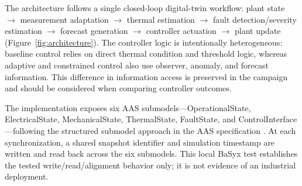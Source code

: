 \documentclass[machines,article,submit,moreauthors]{Definitions/mdpi}
\begin{document}
The architecture follows a single closed-loop digital-twin workflow: plant state $\rightarrow$ measurement adaptation $\rightarrow$ thermal estimation $\rightarrow$ fault detection/severity estimation $\rightarrow$ forecast generation $\rightarrow$ controller actuation $\rightarrow$ plant update (Figure~\ref{fig:architecture}). The controller logic is intentionally heterogeneous: baseline control relies on direct thermal condition and threshold logic, whereas adaptive and constrained control also use observer, anomaly, and forecast information. This difference in information access is preserved in the campaign and should be considered when comparing controller outcomes.

The implementation exposes six AAS submodels—OperationalState, ElectricalState, MechanicalState, ThermalState, FaultState, and ControlInterface—following the structured submodel approach in the AAS specification \cite{aas2023}. At each synchronization, a shared snapshot identifier and simulation timestamp are written and read back across the six submodels. This local BaSyx test establishes the tested write/read/alignment behavior only; it is not evidence of an industrial deployment.
\end{document}
